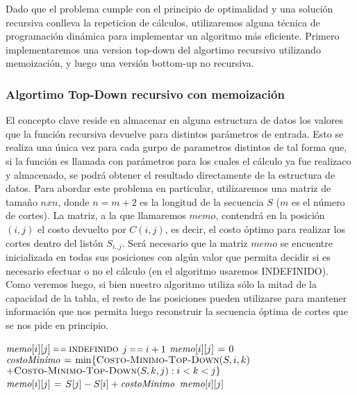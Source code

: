 Dado que el problema cumple con el principio de optimalidad y una soluci\'on recursiva conlleva la repeticion de c\'alculos,
utilizaremos alguna t\'ecnica de programaci\'on din\'amica para implementar un algoritmo m\'as
eficiente. Primero implementaremos una version top-down del algortimo recursivo utilizando memoizaci\'on, y 
luego una versi\'on bottom-up no recursiva. 

\subsubsection{Algortimo Top-Down recursivo con memoizaci\'on}

El concepto clave reside en almacenar en alguna estructura de datos los valores que la funci\'on recursiva devuelve 
para distintos par\'ametros de entrada. Esto se realiza una \'unica vez para cada gurpo de parametros distintos de tal forma que, si la funci\'on es llamada 
con par\'ametros para los cuales el c\'alculo ya fue realizaco y almacenado, se podr\'a obtener el resultado directamente de
la estructura de datos. Para abordar este problema en particular, utilizaremos una matriz de tama\~no $ n x n $, donde $n = m+2$ es la longitud de la secuencia $S$ ($m$ es el n\'umero de cortes). La matriz, a la que llamaremos $memo$, contendr\'a en la posici\'on $(i, j)$
el costo devuelto por $C(i, j)$, es decir, el costo \'optimo para realizar los cortes dentro del list\'on $S_{i..j}$. 
Ser\'a necesario que la matriz $memo$ se encuentre inicializada en todas sus posiciones con alg\'un valor que permita decidir 
si es necesario efectuar o no el c\'alculo (en el algoritmo usaremos INDEFINIDO). Como veremos luego, si bien nuestro algoritmo utiliza s\'olo la mitad de la 
capacidad de la tabla, el resto de las posiciones pueden utilizarse para mantener informaci\'on que nos permita luego 
reconstruir la secuencia \'optima de cortes que se nos pide en principio. 

\begin{algorithm}[h!]
\caption{} 
\begin{codebox}
\li \If $\id{memo}[i][j] \isequal \const{indefinido}$ 
\li	\Then
				\If $j \isequal i+1$
\li			\Then 
						$\id{memo}[i][j] \gets 0$
\li			\Else
\li							$\id{costoMinimo} \gets \min\{\proc{Costo-Minimo-Top-Down}(S, i, k)$ \zi \>\>\>\> $+ \textnormal{\scshape Costo-Minimo-Top-Down}(S, k, j): i < k < j\}$
\li 		$\id{memo}[i][j] \gets S[j] - S[i] + \id{costoMinimo}$
				\End
 		\End
\li \Return $\id{memo}[i][j]$
\End
\end{codebox}
\end{algorithm}
	

